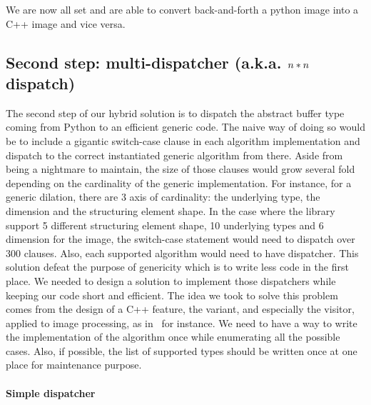 We are now all set and are able to convert back-and-forth a python image into a C++ image and vice versa.

\subsection{Second step: multi-dispatcher (a.k.a. $\protect n*n$ dispatch)}

The second step of our hybrid solution is to dispatch the abstract buffer type coming from Python to an efficient
generic code. The naive way of doing so would be to include a gigantic switch-case clause in each algorithm
implementation and dispatch to the correct instantiated generic algorithm from there. Aside from being a nightmare to
maintain, the size of those clauses would grow several fold depending on the cardinality of the generic implementation.
For instance, for a generic dilation, there are 3 axis of cardinality: the underlying type, the dimension and the
structuring element shape. In the case where the library support 5 different structuring element shape, 10 underlying
types and 6 dimension for the image, the switch-case statement would need to dispatch over 300 clauses. Also, each
supported algorithm would need to have dispatcher. This solution defeat the purpose of genericity which is to write less
code in the first place. We needed to design a solution to implement those dispatchers while keeping our code short and
efficient. The idea we took to solve this problem comes from the design of a C++ feature, the variant, and especially
the visitor, applied to image processing, as in~\parencite{bourdev.2011.runtimedispatch} for instance. We need to have a
way to write the implementation of the algorithm once while enumerating all the possible cases. Also, if possible, the
list of supported types should be written once at one place for maintenance purpose.


\paragraph{Simple dispatcher}

